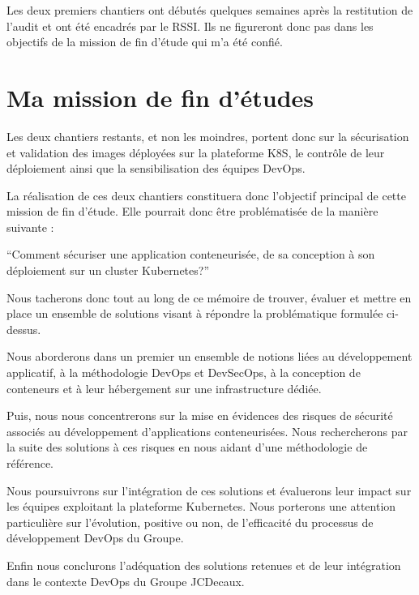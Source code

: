 Les deux premiers chantiers ont débutés quelques semaines après la restitution de l'audit et ont été encadrés par le \ac{RSSI}.
Ils ne figureront donc pas dans les objectifs de la mission de fin d'étude qui m'a été confié.

\newpage

\section{Ma mission de fin d'études}
Les deux chantiers restants, et non les moindres, portent donc sur la sécurisation et validation des images déployées sur
la plateforme \ac{K8S}, le contrôle de leur déploiement ainsi que la sensibilisation des équipes DevOps.

La réalisation de ces deux chantiers constituera donc l'objectif principal de cette mission de fin d'étude.
Elle pourrait donc être problématisée de la manière suivante : 
\begin{center}
    \color{bluejcd}  \enquote{Comment sécuriser une application conteneurisée, de sa conception à son déploiement sur un
     cluster Kubernetes?}
\end{center}

Nous tacherons donc tout au long de ce mémoire de trouver, évaluer et mettre en place un ensemble de solutions visant
à répondre la problématique formulée ci-dessus.

Nous aborderons dans un premier un ensemble de notions liées au développement applicatif, à la méthodologie DevOps 
et DevSecOps, à la conception de conteneurs et à leur hébergement sur une infrastructure dédiée.

Puis, nous nous concentrerons sur la mise en évidences des risques de sécurité associés au développement 
d'applications conteneurisées. Nous rechercherons par la suite des solutions à ces risques en nous aidant d'une 
méthodologie de référence.

Nous poursuivrons sur l'intégration de ces solutions et évaluerons leur impact sur les équipes exploitant la plateforme
Kubernetes. Nous porterons une attention particulière sur l'évolution, positive ou non, de l'efficacité du processus de 
développement DevOps du Groupe.

Enfin nous conclurons l'adéquation des solutions retenues et de leur intégration dans le contexte DevOps du Groupe JCDecaux.



